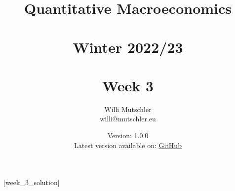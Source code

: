 
\newif\ifDisplaySolutions%


\title{Quantitative Macroeconomics\\~\\Winter 2022/23\\~\\Week 3}
\author{Willi Mutschler\\willi@mutschler.eu}
\date{Version: 1.0.0\\Latest version available on: \href{https://github.com/wmutschl/Quantitative-Macroeconomics/releases/latest/download/week_3.pdf}{GitHub}}
\maketitle\thispagestyle{empty}

\newpage
{}[week_3_solution]
\tableofcontents\thispagestyle{empty}\newpage

\setcounter{page}{1}
\newpage
\newpage
\newpage
\newpage
\printbibliography
\newpage

\ifDisplaySolutions
\newpage
\appendix
\section{Solutions}

\fi
